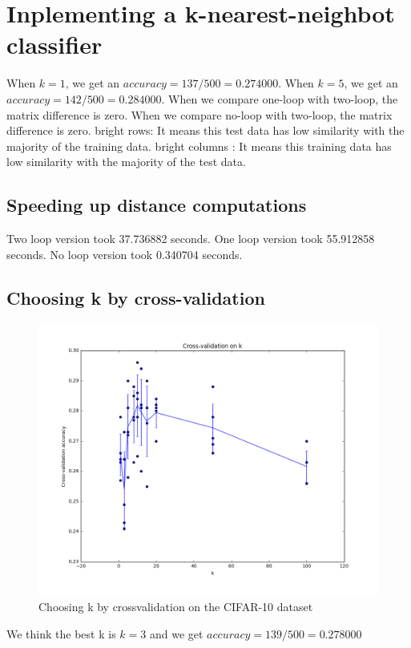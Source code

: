 \documentclass[pdftex,11pt]{article}
\begin{document}
\section{Inplementing a k-nearest-neighbot classifier}

When $k=1$, we get an $accuracy=137/500=0.274000$.
When $k=5$, we get an $accuracy=142/500=0.284000$.
When we compare one-loop with two-loop, the matrix difference is zero.
When we compare no-loop with two-loop, the matrix difference is zero.
bright rows: It means this test data has low similarity with the majority of the training data. bright columns : It means this training data has low similarity with the majority of the test data.
\subsection{Speeding up distance computations}
Two loop version took 37.736882 seconds.
One loop version took 55.912858 seconds.
No loop version took 0.340704 seconds.

\subsection{Choosing k by cross-validation}
\begin{figure}[H]
  \caption{Choosing k by crossvalidation on the CIFAR-10 dataset}
  \centering
    \includegraphics[scale=0.5]{fig1.png}
\end{figure}
We think the best k is $k=3$ and we get $accuracy=139 / 500=0.278000$
\end{document}

